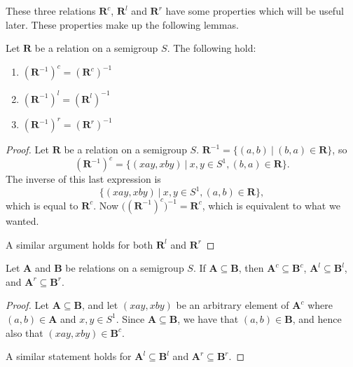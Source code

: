 These three relations $\mathbf{R}^c$, $\mathbf{R}^l$ and $\mathbf{R}^r$ have
some properties which will be useful later.  These properties make up the
following lemmas.

\begin{lemma}
  \label{lem:cinverse}
  Let $\mathbf{R}$ be a relation on a semigroup $S$.
  The following hold:
  \begin{enumerate}[\rm(i)]
  \item $(\mathbf{R}^{-1})^c = (\mathbf{R}^c)^{-1}$
  \item $(\mathbf{R}^{-1})^l = (\mathbf{R}^l)^{-1}$
  \item $(\mathbf{R}^{-1})^r = (\mathbf{R}^r)^{-1}$
  \end{enumerate}
  \begin{proof}
    Let $\mathbf{R}$ be a relation on a semigroup $S$.
    $\mathbf{R}^{-1} = \{(a,b)~|~(b,a)\in\mathbf{R}\}$, so
    $$(\mathbf{R}^{-1})^c = \{(xay,xby)~|~x,y \in S^1, (b,a)\in\mathbf{R}\}.$$
    The inverse of this last expression is
    $$\{(xay,xby)~|~x,y \in S^1, (a,b)\in\mathbf{R}\},$$
    which is equal to $\mathbf{R}^c$.
    Now $\big((\mathbf{R}^{-1})^c\big)^{-1} = \mathbf{R}^c$, which is equivalent
    to what we wanted.

    A similar argument holds for both $\mathbf{R}^l$ and $\mathbf{R}^r$
  \end{proof}
\end{lemma}

\begin{lemma}
  \label{lem:csubset}
  Let $\mathbf{A}$ and $\mathbf{B}$ be relations on a semigroup $S$.  If
  $\mathbf{A} \subseteq \mathbf{B}$, then $\mathbf{A}^c \subseteq \mathbf{B}^c$,
  $\mathbf{A}^l \subseteq \mathbf{B}^l$, and
  $\mathbf{A}^r \subseteq \mathbf{B}^r$.
  \begin{proof}
    Let $\mathbf{A} \subseteq \mathbf{B}$, and let $(xay,xby)$ be an arbitrary
    element of $\mathbf{A}^c$ where $(a,b) \in \mathbf{A}$ and $x,y \in S^1$.
    Since $\mathbf{A} \subseteq \mathbf{B}$, we have that $(a,b) \in
    \mathbf{B}$, and hence also that $(xay,xby) \in \mathbf{B}^c$.

    A similar statement holds for $\mathbf{A}^l \subseteq \mathbf{B}^l$ and
    $\mathbf{A}^r \subseteq \mathbf{B}^r$.
  \end{proof}
\end{lemma}

